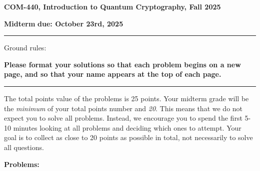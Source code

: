 \documentclass[12pt]{article}
\newcommand{\header}[1]{\begin{center} {\large\bf #1} \end{center}}
\begin{document}
\header{COM-440, Introduction to Quantum Cryptography, Fall 2025}
{\bf Midterm} \hfill {\bf due: October 23rd, 2025}


\medskip

\hrule

\medskip 

Ground rules: 

{\bf Please
  format your solutions so that each problem begins on a new page, and
  so that your name appears at the top of each page.}

\medskip
\hrule
\medskip

The total points value of the problems is 25 points. Your midterm grade will be the \emph{minimum} of your total points number and \emph{20}. This means that we do not expect you to solve all problems. Instead, we encourage you to spend the first 5-10 minutes looking at all problems and deciding which ones to attempt. Your goal is to collect as close to 20 points as possible in total, not necessarily to solve all questions. 
 
\medskip
{\bf Problems:}
\end{document}

